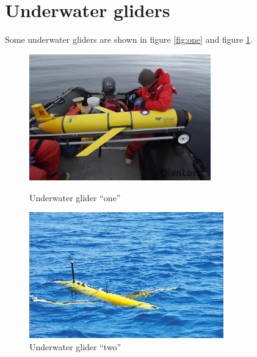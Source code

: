 \documentclass[12pt]{article}
\begin{document}
\section{Underwater gliders}
Some underwater gliders are shown in figure \ref{fig:one} and figure \ref{fig:two}.
\begin{figure}[htb]
\begin{minipage}[t]{0.48\textwidth}
\centering
\includegraphics[width=0.7\textwidth]{fig1}
\caption{Underwater glider ``one''}\label{fig:one}
\end{minipage}
\begin{minipage}[t]{0.48\textwidth}
\centering
\includegraphics[width=0.75\textwidth]{fig2}
\caption{Underwater glider ``two''}\label{fig:two}
\end{minipage}
\end{figure}
\end{document}
